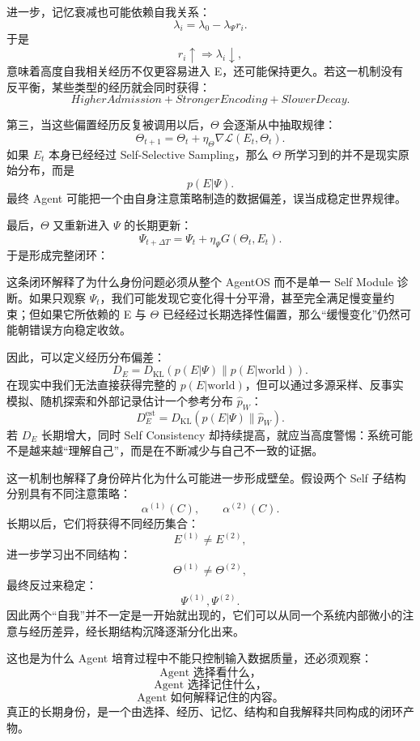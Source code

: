 进一步，记忆衰减也可能依赖自我关系：
\[
\lambda_i
=
\lambda_0
-
\lambda_\Psi r_i.
\]
于是
\[
r_i\uparrow
\Rightarrow
\lambda_i\downarrow,
\]
意味着高度自我相关经历不仅更容易进入 E，还可能保持更久。若这一机制没有反平衡，某些类型的经历就会同时获得：
\[
HigherAdmission
+
StrongerEncoding
+
SlowerDecay.
\]

第三，当这些偏置经历反复被调用以后，$\Theta$ 会逐渐从中抽取规律：
\[
\Theta_{t+1}
=
\Theta_t
+
\eta_\Theta
\nabla
\mathcal L(E_t,\Theta_t).
\]
如果 $E_t$ 本身已经经过 Self-Selective Sampling，那么 $\Theta$ 所学习到的并不是现实原始分布，而是
\[
p(E|\Psi).
\]
最终 Agent 可能把一个由自身注意策略制造的数据偏差，误当成稳定世界规律。

最后，$\Theta$ 又重新进入 $\Psi$ 的长期更新：
\[
\Psi_{t+\Delta T}
=
\Psi_t
+
\eta_\Psi
G(\Theta_t,E_t).
\]
于是形成完整闭环：
\begin{statementbox}
\centering
{}
\end{statementbox}

这条闭环解释了为什么身份问题必须从整个 AgentOS 而不是单一 Self Module 诊断。如果只观察 $\Psi_t$，我们可能发现它变化得十分平滑，甚至完全满足慢变量约束；但如果它所依赖的 E 与 $\Theta$ 已经经过长期选择性偏置，那么“缓慢变化”仍然可能朝错误方向稳定收敛。

因此，可以定义经历分布偏差：
\[
D_E
=
D_{\mathrm{KL}}
\left(
p(E|\Psi)
\|
p(E|\mathrm{world})
\right).
\]
在现实中我们无法直接获得完整的 $p(E|\mathrm{world})$，但可以通过多源采样、反事实模拟、随机探索和外部记录估计一个参考分布 $\hat p_W$：
\[
D_E^{\mathrm{est}}
=
D_{\mathrm{KL}}
\left(
p(E|\Psi)
\|
\hat p_W
\right).
\]
若 $D_E$ 长期增大，同时 Self Consistency 却持续提高，就应当高度警惕：系统可能不是越来越“理解自己”，而是在不断减少与自己不一致的证据。

这一机制也解释了身份碎片化为什么可能进一步形成壁垒。假设两个 Self 子结构分别具有不同注意策略：
\[
\alpha^{(1)}(C),
\qquad
\alpha^{(2)}(C).
\]
长期以后，它们将获得不同经历集合：
\[
E^{(1)}
\neq
E^{(2)},
\]
进一步学习出不同结构：
\[
\Theta^{(1)}
\neq
\Theta^{(2)},
\]
最终反过来稳定：
\[
\Psi^{(1)},
\Psi^{(2)}.
\]
因此两个“自我”并不一定是一开始就出现的，它们可以从同一个系统内部微小的注意与经历差异，经长期结构沉降逐渐分化出来。

这也是为什么 Agent 培育过程中不能只控制输入数据质量，还必须观察：
\[
\text{Agent 选择看什么，}
\]
\[
\text{Agent 选择记住什么，}
\]
\[
\text{Agent 如何解释记住的内容。}
\]
真正的长期身份，是一个由选择、经历、记忆、结构和自我解释共同构成的闭环产物。

